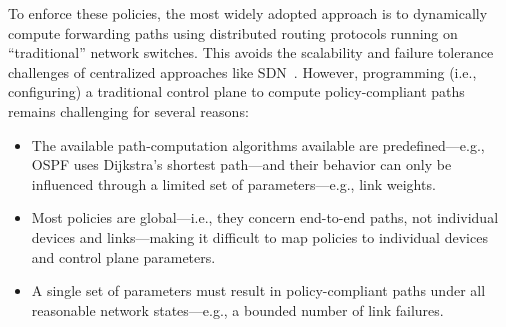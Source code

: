 
To enforce these policies, the most widely adopted approach is to
dynamically compute forwarding paths using distributed routing protocols
running on ``traditional'' network switches.
This avoids the scalability and failure tolerance 
challenges of centralized approaches like SDN~\cite{onos, hasdn, propane}. However, programming (i.e.,
configuring) a traditional control plane to compute policy-compliant paths
remains challenging for several reasons: 
\begin{itemize}
\item The available path-computation algorithms
available are predefined---e.g., OSPF uses
Dijkstra's shortest path---and their behavior can only be influenced
through a limited set of parameters---e.g.,
link weights. 
\item Most policies are
global---i.e., they concern end-to-end paths, not individual devices and
links---making it difficult to map policies to
individual devices and control plane parameters.
\item A single set of parameters must result in
policy-compliant paths under all reasonable network states---e.g., a bounded
number of link failures.
\end{itemize}

